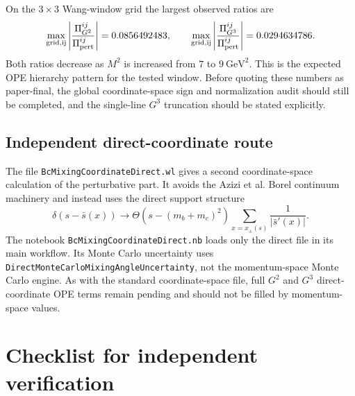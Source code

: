\documentclass[11pt]{article}
\begin{document}
On the \(3\times3\) Wang-window grid the largest observed ratios are
\[
  \max_{\rm grid,ij}\left|
    \frac{\Pi_{G^2}^{ij}}{\Pi_{\rm pert}^{ij}}
  \right|
  =
  0.0856492483,
  \qquad
  \max_{\rm grid,ij}\left|
    \frac{\Pi_{G^3}^{ij}}{\Pi_{\rm pert}^{ij}}
  \right|
  =
  0.0294634786.
\]
Both ratios decrease as \(M^2\) is increased from
\(7\) to \(9~\mathrm{GeV}^2\).  This is the expected OPE hierarchy pattern for
the tested window.  Before quoting these numbers as paper-final, the global
coordinate-space sign and normalization audit should still be completed, and
the single-line \(G^3\) truncation should be stated explicitly.

\subsection{Independent direct-coordinate route}

The file \texttt{BcMixingCoordinateDirect.wl} gives a second coordinate-space
calculation of the perturbative part.  It avoids the Azizi et al. Borel
continuum machinery and instead uses the direct support structure
\[
  \delta\!\left(s-\bar s(x)\right)
  \rightarrow
  \Theta\!\left(s-(m_b+m_c)^2\right)
  \sum_{x=x_\pm(s)}
  \frac{1}{|\bar s'(x)|}.
\]
The notebook \texttt{BcMixingCoordinateDirect.nb} loads only the direct file in
its main workflow.  Its Monte Carlo uncertainty uses
\texttt{DirectMonteCarloMixingAngleUncertainty}, not the momentum-space Monte
Carlo engine.  As with the standard coordinate-space file, full \(G^2\) and
\(G^3\) direct-coordinate OPE terms remain pending and should not be filled by
momentum-space values.

\section{Checklist for independent verification}
\end{document}
